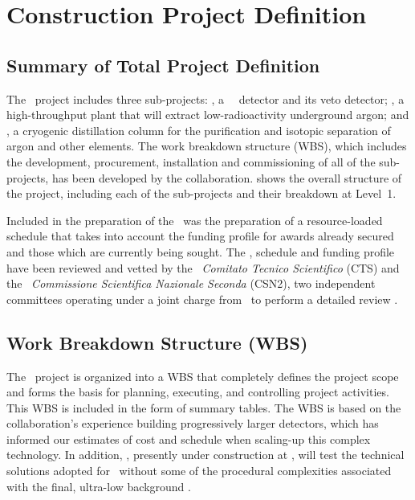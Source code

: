 \section{Construction Project Definition}

\subsection{Summary of Total Project Definition}
The \DSk\ project includes three sub-projects: \DSk, a \LArTPC\ \WIMP\ detector and its veto detector; \Urania, a high-throughput plant that will extract low-radioactivity underground argon; and \Aria, a cryogenic distillation column for the purification and isotopic separation of argon and other elements. The work breakdown structure (WBS), which includes the development, procurement, installation and commissioning of all of the sub-projects, has been developed by the collaboration.   shows the overall structure of the project, including each of the sub-projects and their breakdown at Level~1.  

Included in the preparation of the \WBS\ was the preparation of a resource-loaded schedule that takes into account the funding profile for awards already secured and those which are currently being sought.  The \WBS, schedule and funding profile have been reviewed and vetted by the \INFN\ {\it Comitato Tecnico Scientifico} (CTS) and the \INFN\ {\it Commissione Scientifica Nazionale Seconda} (CSN2), two independent committees operating under a joint charge from \INFN\ to perform a detailed review \DSks.


\subsection{Work Breakdown Structure (WBS)}
\label{sec:WorkBreakdownStructure}
The \DSk\ project is organized into a WBS that completely defines the project scope and forms the basis for planning, executing, and controlling project activities. This WBS is included in the form of summary tables. The WBS is based on the collaboration's experience building progressively larger detectors, which has informed our estimates of cost and schedule when scaling-up this complex technology. In addition, \DSps, presently under construction at \CERN, will test the technical solutions adopted for \DSks\ without some of the procedural complexities associated with the final, ultra-low background \DSks.

